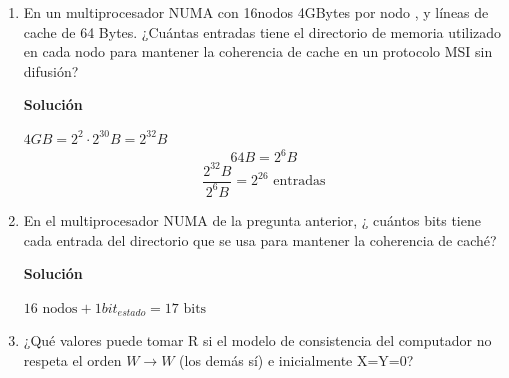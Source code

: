\documentclass[12pt,spanish]{article}
\newenvironment{solution}{
	\par
	\textbf{Solución}
	\par
	\begin{center}
}
{
	\end{center}
}
\begin{document}
\begin{enumerate}
	\item En un multiprocesador NUMA con 16nodos 4GBytes por nodo , y líneas de cache de 64 Bytes. ¿Cuántas entradas tiene el directorio de memoria utilizado en cada nodo para mantener la coherencia de cache en un protocolo MSI sin difusión?
	\begin{solution}
		$4GB=2^2 \cdot 2^{30} B=2^{32}B$
		\[64B= 2^6 B\]
		\[\frac{2^{32}B}{2^6B}=2^{26}\text{ entradas}\]
	\end{solution}
	\item En el multiprocesador NUMA de la pregunta anterior, ¿ cuántos bits tiene cada entrada del directorio que se usa para mantener la coherencia de caché?
	\begin{solution}
		$16\text{ nodos} + 1bit_{estado}=17\text{ bits}$
	\end{solution}
	\item ¿Qué valores puede tomar R si el modelo de consistencia del computador no respeta el orden $W \rightarrow W$ (los demás sí) e inicialmente X=Y=0?


\end{enumerate}
\end{document}
